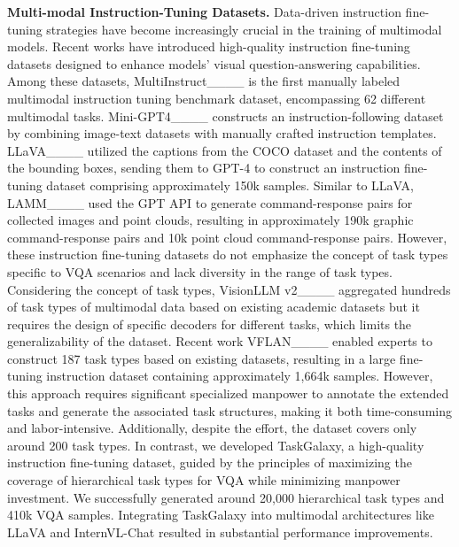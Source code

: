 \textbf{Multi-modal Instruction-Tuning Datasets.} 
Data-driven instruction fine-tuning strategies have become increasingly crucial in the training of multimodal models. Recent works have introduced high-quality instruction fine-tuning datasets designed to enhance models' visual question-answering capabilities. Among these datasets, MultiInstruct____ is the first manually labeled multimodal instruction tuning benchmark dataset, encompassing 62 different multimodal tasks. Mini-GPT4____ constructs an instruction-following dataset by combining image-text datasets with manually crafted instruction templates. LLaVA____ utilized the captions from the COCO dataset and the contents of the bounding boxes, sending them to GPT-4 to construct an instruction fine-tuning dataset comprising approximately 150k samples. Similar to LLaVA, LAMM____ used the GPT API to generate command-response pairs for collected images and point clouds, resulting in approximately 190k graphic command-response pairs and 10k point cloud command-response pairs. However, these instruction fine-tuning datasets do not emphasize the concept of task types specific to VQA scenarios and lack diversity in the range of task types. Considering the concept of task types, VisionLLM v2____ aggregated hundreds of task types of multimodal data based on existing academic datasets but it requires the design of specific decoders for different tasks, which limits the generalizability of the dataset. Recent work VFLAN____ enabled experts to construct 187 task types based on existing datasets, resulting in a large fine-tuning instruction dataset containing approximately 1,664k samples. However, this approach requires significant specialized manpower to annotate the extended tasks and generate the associated task structures, making it both time-consuming and labor-intensive. Additionally, despite the effort, the dataset covers only around 200 task types. In contrast, we developed TaskGalaxy, a high-quality instruction fine-tuning dataset, guided by the principles of maximizing the coverage of hierarchical task types for VQA while minimizing manpower investment. We successfully generated around 20,000 hierarchical task types and 410k VQA samples. Integrating TaskGalaxy into multimodal architectures like LLaVA and InternVL-Chat resulted in substantial performance improvements.

\vspace{-0.2cm}